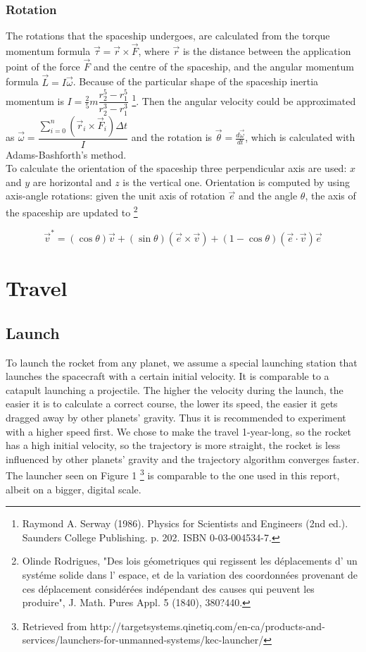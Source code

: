 \documentclass[10pt,a4paper]{article}
\begin{document}
	
	\subsubsection{Rotation}
	The rotations that the spaceship undergoes, are calculated from the torque momentum formula $\vec{\tau} = \vec{r} \times \vec{F}$, where $\vec{r}$ is the distance between the application point of the force $\vec{F}$ and the centre of the spaceship, and the angular momentum formula $ \vec{L} = I \vec{\omega}$. Because of the particular shape of the spaceship inertia momentum is $I = \frac{2}{5}m \dfrac{r^5_2 - r^5_1}{r^3_2 - r^3_1}$ \footnote{Raymond A. Serway (1986). Physics for Scientists and Engineers (2nd ed.). Saunders College Publishing. p. 202. ISBN 0-03-004534-7.}. Then the angular velocity could be approximated as $\vec{\omega} = \dfrac{\sum_{i = 0}^{n}(\vec{r}_i \times \vec{F}_i)\Delta t}{I} $ and the rotation is $\vec{\theta} = \frac{d\vec{\omega}}{dt} $, which is calculated with Adams-Bashforth's method.\\
	To calculate the orientation of the spaceship three perpendicular axis are used: $x$ and $y$ are horizontal and $z$ is the vertical one. Orientation is computed by using axis-angle rotations: given the unit axis of rotation $\vec{e}$ and the angle $\theta$, the axis of the spaceship are updated to
	\footnote{Olinde Rodrigues, "Des lois géometriques qui regissent les déplacements d' un systéme solide dans l' espace, et de la variation des coordonnées provenant de ces déplacement considérées indépendant des causes qui peuvent les produire", J. Math. Pures Appl. 5 (1840), 380?440.}
	
	\begin{equation}
	\vec{v}^* = (\cos\theta)\vec{v} + (\sin\theta)(\vec{e} \times \vec{v}) + (1 - \cos\theta)(\vec{e} \cdot \vec{v}) \vec{e}
	\end{equation}
	
	\section{Travel}    
	\subsection{Launch}
	To launch the rocket from any planet, we assume a special launching station that launches the spacecraft with a certain initial velocity. It is comparable to a catapult launching a projectile. The higher the velocity during the launch, the easier it is to calculate a correct course, the lower its speed, the easier it gets dragged away by other planets' gravity. Thus it is recommended to experiment with a higher speed first.
	We chose to make the travel 1-year-long, so the rocket has a high initial velocity, so the trajectory is more straight, the rocket is less influenced by other planets' gravity and the trajectory algorithm converges faster.
	The launcher seen on Figure 1 \footnote{Retrieved from http://targetsystems.qinetiq.com/en-ca/products-and-services/launchers-for-unmanned-systems/kec-launcher/} is comparable to the one used in this report, albeit on a bigger, digital scale.
	
\end{document}
